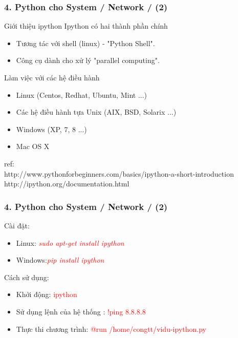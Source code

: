 \documentclass[10pt]{beamer}
\begin{document}
\label{Slide 4:Python cho Sysad - ipython}
\begin{frame}[fragile] \label{Gioi thieu ipython}
\label{Slide xxx: Gioi thieu ve ipython }
\frametitle{4. Python cho System / Network / (2) }
\begin{block}{Giới thiệu ipython}
Ipython có hai thành phần chính
\begin{itemize}
\item Tương tác với shell (linux) - "Python Shell".
\item Công cụ dành cho xử lý "parallel computing".
\end{itemize}
Làm việc với các hệ điều hành
\begin{itemize}
\item Linux (Centos, Redhat, Ubuntu, Mint ...)
\item Các hệ điều hành tựa Unix (AIX, BSD, Solarix ...)
\item Windows (XP, 7, 8 ...)
\item Mac OS X
\end{itemize}
\end{block}
ref:\\
http://www.pythonforbeginners.com/basics/ipython-a-short-introduction\\
http://ipython.org/documentation.html
\end{frame}
\label{Slide xxx: cai dat va su dung ipython}
\begin{frame}[fragile]
\frametitle{4. Python cho System / Network / (2)}
Cài đặt:
\pause
\begin{itemize}
\item Linux: \textit{\textcolor{red}{sudo apt-get install ipython}}
\pause
\item Windows:\textit{\textcolor{red}{pip install ipython}}
\end{itemize}
\pause
Cách sử dụng:
\pause
\begin{itemize}
\item Khởi động: \textcolor{red}{ipython}\pause
\item Sử dụng lệnh của hệ thống : \textcolor{red}{!ping 8.8.8.8}\pause
\item Thực thi chương trình: \textcolor{red}{@run /home/congtt/vidu-ipython.py}
\end{itemize}
\end{frame}
\label{Slide xxx:Python cho Sysad - fabric}
\end{document}
